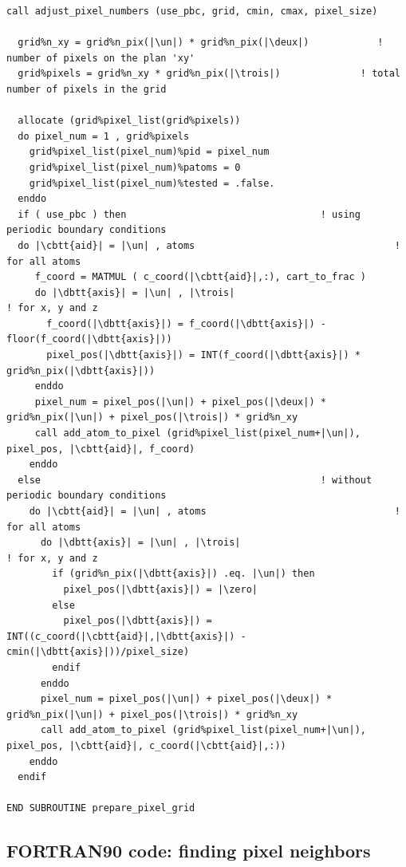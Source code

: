 \begin{lstlisting}[language={[90]FORTRAN}]
  call adjust_pixel_numbers (use_pbc, grid, cmin, cmax, pixel_size)
    
  grid%n_xy = grid%n_pix(|\un|) * grid%n_pix(|\deux|)            ! number of pixels on the plan 'xy'
  grid%pixels = grid%n_xy * grid%n_pix(|\trois|)              ! total number of pixels in the grid

  allocate (grid%pixel_list(grid%pixels))
  do pixel_num = 1 , grid%pixels
    grid%pixel_list(pixel_num)%pid = pixel_num
    grid%pixel_list(pixel_num)%patoms = 0
    grid%pixel_list(pixel_num)%tested = .false.
  enddo
  if ( use_pbc ) then                                  ! using periodic boundary conditions
  do |\cbtt{aid}| = |\un| , atoms                                   ! for all atoms
     f_coord = MATMUL ( c_coord(|\cbtt{aid}|,:), cart_to_frac )
     do |\dbtt{axis}| = |\un| , |\trois|                                   ! for x, y and z
       f_coord(|\dbtt{axis}|) = f_coord(|\dbtt{axis}|) - floor(f_coord(|\dbtt{axis}|))
       pixel_pos(|\dbtt{axis}|) = INT(f_coord(|\dbtt{axis}|) * grid%n_pix(|\dbtt{axis}|))
     enddo
     pixel_num = pixel_pos(|\un|) + pixel_pos(|\deux|) * grid%n_pix(|\un|) + pixel_pos(|\trois|) * grid%n_xy
     call add_atom_to_pixel (grid%pixel_list(pixel_num+|\un|), pixel_pos, |\cbtt{aid}|, f_coord)
    enddo
  else                                                 ! without periodic boundary conditions
    do |\cbtt{aid}| = |\un| , atoms                                 ! for all atoms
      do |\dbtt{axis}| = |\un| , |\trois|                                  ! for x, y and z
        if (grid%n_pix(|\dbtt{axis}|) .eq. |\un|) then
          pixel_pos(|\dbtt{axis}|) = |\zero|
        else
          pixel_pos(|\dbtt{axis}|) = INT((c_coord(|\cbtt{aid}|,|\dbtt{axis}|) - cmin(|\dbtt{axis}|))/pixel_size)
        endif
      enddo
      pixel_num = pixel_pos(|\un|) + pixel_pos(|\deux|) * grid%n_pix(|\un|) + pixel_pos(|\trois|) * grid%n_xy
      call add_atom_to_pixel (grid%pixel_list(pixel_num+|\un|), pixel_pos, |\cbtt{aid}|, c_coord(|\cbtt{aid}|,:))
    enddo
  endif

END SUBROUTINE prepare_pixel_grid
\end{lstlisting}

\clearpage

\subsection{FORTRAN90 code: finding pixel neighbors}
\label{f-find-pn}

